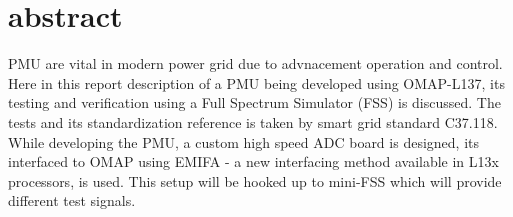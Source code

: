 \section{abstract}
PMU are vital in modern power grid due to advnacement operation and control. Here in this report description of a PMU being developed using OMAP-L137, its testing and verification using a Full Spectrum Simulator (FSS) is discussed. The tests and its standardization reference is taken by smart grid standard C37.118. While developing the PMU, a custom high speed ADC board is designed, its interfaced to OMAP using EMIFA - a new interfacing method available in L13x processors, is used. This setup will be hooked up to mini-FSS which will provide different test signals.